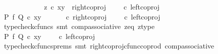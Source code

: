 \begin{isabellebody}
\ \ \ \ \isamarkupfalse%
\isanewline
\ \ \ \ \ \ \isamarkupfalse%
\ {\isachardoublequoteopen}z\ {\isasymcirc}\isactrlsub c\ {\isasymlangle}x{\isacharcomma}{\kern0pt}y{\isasymrangle}\ {\isacharequal}{\kern0pt}\ right{\isacharunderscore}{\kern0pt}coproj\ {\isasymone}\ {\isacharparenleft}{\kern0pt}{\isasymone}\ {\isasymCoprod}\ {\isasymone}{\isacharparenright}{\kern0pt}\ {\isasymcirc}\isactrlsub c\ left{\isacharunderscore}{\kern0pt}coproj\ {\isasymone}\ {\isasymone}{\isachardoublequoteclose}\isanewline
\ \ \ \ \ \ \isamarkupfalse%
\ \isamarkupfalse%
\ {\isachardoublequoteopen}{\isacharparenleft}{\kern0pt}P\ {\isasymtimes}\isactrlsub f\ Q{\isacharparenright}{\kern0pt}\ {\isasymcirc}\isactrlsub c\ {\isasymlangle}x{\isacharcomma}{\kern0pt}y{\isasymrangle}\ {\isacharequal}{\kern0pt}\ {\isacharparenleft}{\kern0pt}{\isasymlangle}{\isasymt}{\isacharcomma}{\kern0pt}{\isasymt}{\isasymrangle}\ {\isasymamalg}\ {\isasymlangle}{\isasymf}{\isacharcomma}{\kern0pt}{\isasymf}{\isasymrangle}\ {\isasymamalg}\ {\isasymlangle}{\isasymf}{\isacharcomma}{\kern0pt}{\isasymt}{\isasymrangle}{\isacharparenright}{\kern0pt}\ {\isasymcirc}\isactrlsub c\ right{\isacharunderscore}{\kern0pt}coproj\ {\isasymone}\ {\isacharparenleft}{\kern0pt}{\isasymone}\ {\isasymCoprod}\ {\isasymone}{\isacharparenright}{\kern0pt}\ {\isasymcirc}\isactrlsub c\ left{\isacharunderscore}{\kern0pt}coproj\ {\isasymone}\ {\isasymone}{\isachardoublequoteclose}\isanewline
\ \ \ \ \ \ \ \ \isamarkupfalse%
\ {\isacharparenleft}{\kern0pt}typecheck{\isacharunderscore}{\kern0pt}cfuncs{\isacharcomma}{\kern0pt}\ smt\ comp{\isacharunderscore}{\kern0pt}associative{}\ z{\isacharunderscore}{\kern0pt}eq\ z{\isacharunderscore}{\kern0pt}type{\isacharparenright}{\kern0pt}\isanewline
\ \ \ \ \ \ \isamarkupfalse%
\ \isamarkupfalse%
\ {\isachardoublequoteopen}{\isacharparenleft}{\kern0pt}P\ {\isasymtimes}\isactrlsub f\ Q{\isacharparenright}{\kern0pt}\ {\isasymcirc}\isactrlsub c\ {\isasymlangle}x{\isacharcomma}{\kern0pt}y{\isasymrangle}\ {\isacharequal}{\kern0pt}\ {\isacharparenleft}{\kern0pt}{\isasymlangle}{\isasymf}{\isacharcomma}{\kern0pt}{\isasymf}{\isasymrangle}\ {\isasymamalg}\ {\isasymlangle}{\isasymf}{\isacharcomma}{\kern0pt}{\isasymt}{\isasymrangle}{\isacharparenright}{\kern0pt}\ {\isasymcirc}\isactrlsub c\ left{\isacharunderscore}{\kern0pt}coproj\ {\isasymone}\ {\isasymone}{\isachardoublequoteclose}\isanewline
\ \ \ \ \ \ \ \ \isamarkupfalse%
\ {\isacharparenleft}{\kern0pt}typecheck{\isacharunderscore}{\kern0pt}cfuncs{\isacharunderscore}{\kern0pt}prems{\isacharcomma}{\kern0pt}\ smt\ right{\isacharunderscore}{\kern0pt}coproj{\isacharunderscore}{\kern0pt}cfunc{\isacharunderscore}{\kern0pt}coprod\ comp{\isacharunderscore}{\kern0pt}associative{}{\isacharparenright}{\kern0pt}\isanewline

\end{isabellebody}

